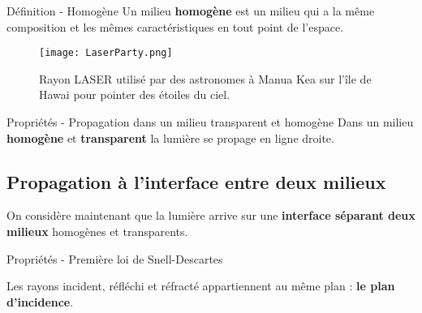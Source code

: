 \documentclass[french, a4paper, 12pt]{article}
\begin{document}
\begin{definition}{Définition - Homogène}
	Un milieu \textbf{homogène} est un milieu qui a la même composition et les mêmes caractéristiques en tout point de l'espace.
		
		

\end{definition}
\clearpage
\begin{figure}[ht]
	\centering
	\begin{minipage}{.45\textwidth}
		\centering
	\texttt{[image: LaserParty.png]}
	\end{minipage}\hspace{2cm}
	\begin{minipage}{.4\textwidth}
	\caption{Rayon LASER utilisé par des astronomes à Manua Kea sur l'île de Hawai pour pointer des étoiles du ciel.}
	\end{minipage}
\end{figure}

\begin{Proposition}{Propriétés - Propagation dans un milieu transparent et homogène}
	Dans un milieu \textbf{homogène} et \textbf{transparent} la lumière se propage en ligne droite.
	


\end{Proposition}

\subsection{Propagation à l'interface entre deux milieux}

On considère maintenant que la lumière arrive sur une \textbf{interface séparant deux milieux} homogènes et transparents. 

\begin{Proposition}{Propriétés - Première loi de Snell-Descartes}
	
	Les rayons incident, réfléchi et réfracté appartiennent au même plan : \textbf{le plan d'incidence}.
	

	
\end{Proposition}
\end{document}
